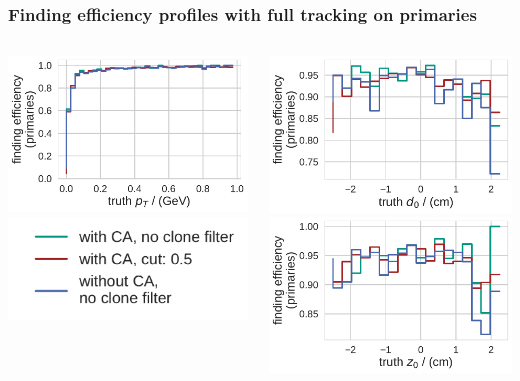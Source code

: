 \documentclass[18pt, aspectratio=169]{beamer}
\begin{document}
\begin{frame}
  \frametitle{Finding efficiency profiles with full tracking on primaries}
  \begin{columns}
    \begin{column}{.5\textwidth}
      \includegraphics[width=.7\textwidth]{figures/findeff_by_pt_truth_fullreco_trainedWithFakes.pdf}\\
      \includegraphics[width=.7\textwidth]{figures/legend_fom_profile.pdf}\\
    \end{column}    
    \begin{column}{.5\textwidth}
      \includegraphics[width=.7\textwidth]{figures/findeff_by_d0_truth_fullreco_trainedWithFakes.pdf}\\
      \includegraphics[width=.7\textwidth]{figures/findeff_by_z0_truth_fullreco_trainedWithFakes.pdf}
    \end{column}
  \end{columns}
\end{frame}
\end{document}
